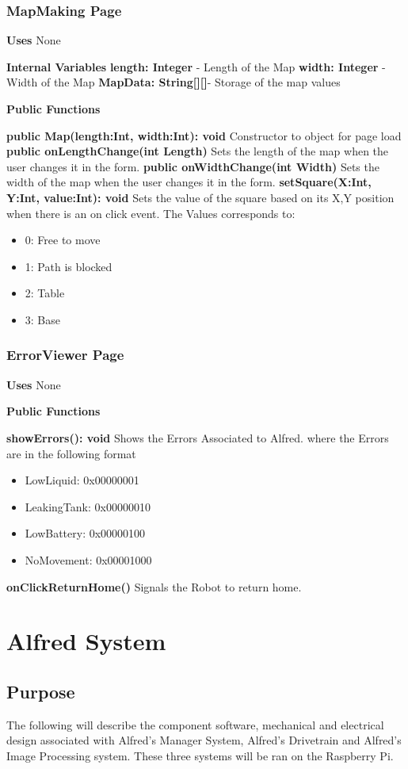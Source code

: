 \documentclass [10pt]{article}
\begin{document}
\subsubsection{MapMaking Page}
\textbf{Uses}
None

\textbf{Internal Variables}
\textbf{length: Integer} - Length of the Map
\textbf{width: Integer} - Width of the Map
\textbf{MapData: String[][]}- Storage of the map values

\textbf{Public Functions}

\textbf{public Map(length:Int, width:Int): void}
Constructor to object for page load
\textbf{public onLengthChange(int Length)}
Sets the length of the map when the user changes it in the form.
\textbf{public onWidthChange(int Width)}
Sets the width of the map when the user changes it in the form.
\textbf{setSquare(X:Int, Y:Int, value:Int): void}
Sets the value of the square based on its X,Y position when there is an on click event. The Values corresponds to:  
\begin{itemize}
	\item 0: Free to move
	\item 1: Path is blocked
	\item 2: Table
	\item 3: Base
\end{itemize}
\subsubsection{ErrorViewer Page}
\textbf{Uses}
None

\textbf{Public Functions}

\textbf{ showErrors(): void}
Shows the Errors Associated to Alfred. where the Errors are in the following format
\begin{itemize}
	\item LowLiquid: 0x00000001
	\item LeakingTank: 0x00000010
	\item LowBattery: 0x00000100
	\item NoMovement: 0x00001000
\end{itemize}

\textbf{onClickReturnHome()}
Signals the Robot to return home.

\section {Alfred System}


\subsection{Purpose}
The following will describe the component software, mechanical and electrical design associated with Alfred's Manager System, Alfred's Drivetrain and Alfred's Image Processing system. These three systems will be ran on the Raspberry Pi. 
\end{document}
